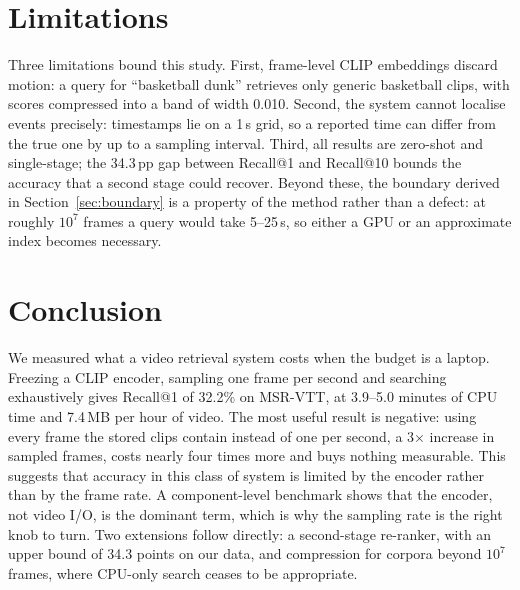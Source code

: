 \documentclass[journal]{IEEEtran}
\begin{document}
\section{Limitations}\label{sec:limits}

Three limitations bound this study. First, frame-level CLIP embeddings
discard motion: a query for ``basketball dunk'' retrieves only generic basketball clips, with
scores compressed into a band of width 0.010. Second, the system cannot localise events precisely:
timestamps lie on a 1\,s grid, so a reported time can differ from the true one by up to a sampling
interval. Third, all results are zero-shot and single-stage; the 34.3\,pp gap
between Recall@1 and Recall@10 bounds the accuracy that a second stage could recover. Beyond
these, the boundary derived in Section~\ref{sec:boundary} is a property of the method rather than a defect: at
roughly $10^{7}$ frames a query would take 5--25\,s, so either a GPU or an approximate index
becomes necessary.

\section{Conclusion}

We measured what a video retrieval system costs when the budget is a laptop. Freezing a CLIP
encoder, sampling one frame per second and searching exhaustively gives Recall@1 of 32.2\% on
MSR-VTT, at 3.9--5.0 minutes of CPU time and 7.4\,MB per hour of video. The most useful result is
negative: using every frame the stored clips contain instead of one per second, a 3$\times$
increase in sampled frames, costs nearly four times more and buys nothing measurable. This
suggests that accuracy in this class of system is limited by the encoder rather than by the frame
rate. A
component-level benchmark shows that the encoder, not video I/O, is the dominant term, which
is why the sampling rate is the right knob to turn. Two extensions follow directly: a second-stage
re-ranker, with an upper bound of 34.3 points on our data, and compression for corpora beyond
$10^{7}$ frames, where CPU-only search ceases to be appropriate.



\end{document}
